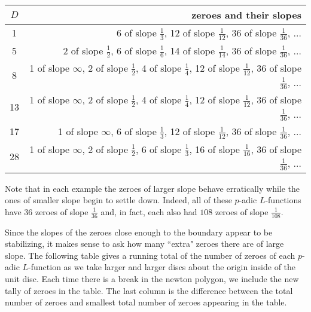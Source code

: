 \documentclass{amsart}
\theoremstyle{plain}
\theoremstyle{definition}
\begin{document}
\begin{center}
\begin{tabular}{|c|r|}
\hline
$D$ &   zeroes and their slopes  \\
\hline
1 &
6 of slope $\frac{1}{3}$, 12  of slope $\frac{1}{12}$, 36  of slope $\frac{1}{36}$, $\dots$ \\
\hline
5 &
2  of slope $\frac{1}{2}$, 6  of slope $\frac{1}{6}$, 14  of slope $\frac{1}{14}$, 36  of slope $\frac{1}{36}$, $\dots$ \\
\hline
8 &
1  of slope $\infty$, 2  of slope $\frac{1}{2}$, 4  of slope $\frac{1}{4}$, 12  of slope $\frac{1}{12}$, 36  of slope $\frac{1}{36}$, $\dots$ \\
\hline
13 &
1  of slope $\infty$, 2  of slope $\frac{1}{2}$, 4  of slope $\frac{1}{4}$, 12  of slope $\frac{1}{12}$, 36  of slope $\frac{1}{36}$, $\dots$ \\
\hline
17 & 1  of slope $\infty$, 6  of slope $\frac{1}{3}$, 12  of slope $\frac{1}{12}$, 36  of slope $\frac{1}{36}$, $\dots$  \\
\hline
28 & 1  of slope $\infty$, 2 of slope $\frac{1}{2}$, 6  of slope $\frac{1}{3}$, 16  of slope $\frac{1}{16}$, 36  of slope $\frac{1}{36}$, $\dots$  \\
\hline
\end{tabular}
\end{center}

\vspace{.2cm}

Note that in each example the zeroes of larger slope behave erratically while the ones of smaller slope begin to settle down.  Indeed, all of these $p$-adic $L$-functions have 36 zeroes of slope $\frac{1}{36}$ and, in fact, each also had $108$ zeroes of slope $\frac{1}{108}$. 

Since the slopes of the zeroes close enough to the boundary appear to be stabilizing, it makes sense to ask how many ``extra" zeroes there are of large slope.  The following table gives a running total of the number of zeroes of each $p$-adic $L$-function as we take larger and larger discs about the origin inside of the unit disc.  Each time there is a break in the newton polygon, we include the new tally of zeroes in the table.  The last column is the difference between the total number of zeroes and smallest total number of zeroes appearing in the table.

\vspace{.2cm}
\end{document}
